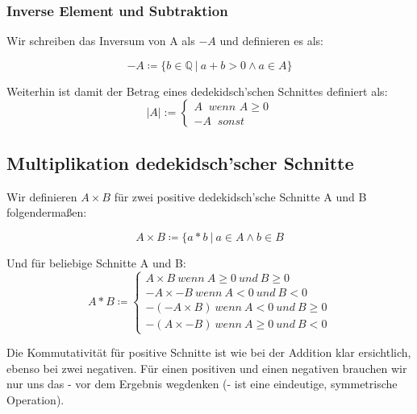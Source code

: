 \documentclass[12pt]{article}
\begin{document}

    \subsubsection{Inverse Element und Subtraktion}

    Wir schreiben das Inversum von A als $-A$ und definieren es als:

    \[-A \coloneqq \{b \in \mathbb{Q} \mspace{4mu} | \mspace{4mu} a + b > 0 \land a \in A\}\]



    Weiterhin ist damit der Betrag eines dedekidsch'schen Schnittes definiert als:
    \[|A| := \begin{cases}A \mspace{10mu} wenn \mspace{6mu} A \ge 0 \\ -A \mspace{10mu} sonst\end{cases}\]

    \subsection{Multiplikation dedekidsch'scher Schnitte}

    Wir definieren $A \times B$ für zwei positive dedekidsch'sche Schnitte A und B folgendermaßen:

    \[A \times B \coloneqq \{a * b \mspace{4mu} | \mspace{4mu} a \in A \land b \in B\]


    Und für beliebige Schnitte A und B:
    \[
        A * B \coloneqq
        \begin{cases}
            A \times B \mspace{4mu} wenn \mspace{4mu} A \ge 0 \mspace{4mu} und \mspace{4mu} B \ge 0 \\
            -A \times -B \mspace{4mu} wenn \mspace{4mu} A < 0 \mspace{4mu} und \mspace{4mu} B < 0 \\
            -(-A \times B) \mspace{4mu} wenn \mspace{4mu} A < 0 \mspace{4mu} und \mspace{4mu} B \ge 0  \\
            -(A \times -B) \mspace{4mu} wenn \mspace{4mu} A \ge 0 \mspace{4mu} und \mspace{4mu} B < 0
        \end{cases}
    \]

    Die Kommutativität für positive Schnitte ist wie bei der Addition klar ersichtlich, ebenso bei zwei negativen.
    Für einen positiven und einen negativen brauchen wir nur uns das - vor dem Ergebnis wegdenken
    (- ist eine eindeutige, symmetrische Operation).
\end{document}
